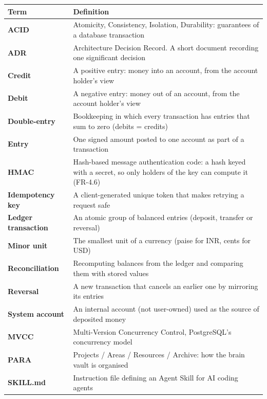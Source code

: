 \documentclass[11pt,a4paper]{article}
\newcounter{none} %
\begin{document}
{\def\LTcaptype{none} %
\begin{longtable}[]{@{}
  >{\raggedright\arraybackslash}p{}
  >{\raggedright\arraybackslash}p{}@{}}
\toprule\noalign{}
\begin{minipage}[b]{\linewidth}\raggedright
Term
\end{minipage} & \begin{minipage}[b]{\linewidth}\raggedright
Definition
\end{minipage} \\
\midrule\noalign{}
\endhead
\bottomrule\noalign{}
\endlastfoot
\textbf{ACID} & Atomicity, Consistency, Isolation, Durability: guarantees of a database transaction \\
\textbf{ADR} & Architecture Decision Record. A short document recording one significant decision \\
\textbf{Credit} & A positive entry: money into an account, from the account holder's view \\
\textbf{Debit} & A negative entry: money out of an account, from the account holder's view \\
\textbf{Double-entry} & Bookkeeping in which every transaction has entries that sum to zero (debits = credits) \\
\textbf{Entry} & One signed amount posted to one account as part of a transaction \\
\textbf{HMAC} & Hash-based message authentication code: a hash keyed with a secret, so only holders of the key can compute it (FR-4.6) \\
\textbf{Idempotency key} & A client-generated unique token that makes retrying a request safe \\
\textbf{Ledger transaction} & An atomic group of balanced entries (deposit, transfer or reversal) \\
\textbf{Minor unit} & The smallest unit of a currency (paise for INR, cents for USD) \\
\textbf{Reconciliation} & Recomputing balances from the ledger and comparing them with stored values \\
\textbf{Reversal} & A new transaction that cancels an earlier one by mirroring its entries \\
\textbf{System account} & An internal account (not user-owned) used as the source of deposited money \\
\textbf{MVCC} & Multi-Version Concurrency Control, PostgreSQL's concurrency model \\
\textbf{PARA} & Projects / Areas / Resources / Archive: how the brain vault is organised \\
\textbf{SKILL.md} & Instruction file defining an Agent Skill for AI coding agents \\
\end{longtable}
}
\end{document}
